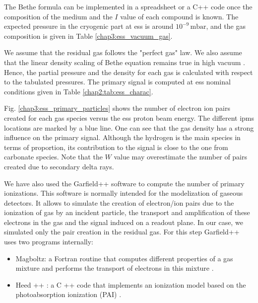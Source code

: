 \begin{refsection}
  The Bethe formula can be implemented in a spreadsheet or a C++ code once the composition of the medium and the \(I\) value of each compound is known. The expected pressure in the cryogenic part at \acrshort{ess} is around \(10^{-9}\,\mathrm{mbar}\), and the gas composition is given in Table \ref{chap3:ess_vacuum_gas}.

  

  We assume that the residual gas follows the "perfect gas" law. We also assume that the linear density scaling of Bethe equation remains true in high vacuum \cite[p. 108]{egberts2012}\cite{Ishimaru1995}. Hence, the partial pressure and the density for each gas is calculated with respect to the tabulated pressures. The primary signal is computed at \acrshort{ess} nominal conditions given in Table \ref{chap2:tab:ess_charac}.

  Fig. \ref{chap3:ess_primary_particles} shows the number of electron ion pairs created for each gas species versus the \acrshort{ess} proton beam energy. The different \acrshort{ipm}s locations are marked by a blue line. One can see that the gas density has a strong influence on the primary signal. Although the hydrogen is the main species in terms of proportion, its contribution to the signal is close to the one from carbonate species. Note that the \(W\) value may overestimate the number of pairs created due to secondary delta rays.
  

  We have also used the Garfield++ software to compute the number of primary  ionizations. This software is normally intended for the modelization of gaseous detectors. It allows to simulate the creation of electron/ion pairs due to the ionization of gas by an incident particle, the transport and amplification of these electrons in the gas and the signal induced on a readout plane. In our case, we simulated only the pair creation in the residual gas. For this step Garfield++ uses two programs internally:
  \begin{itemize}
    \item Magboltz: a Fortran routine that computes different properties of a gas mixture and performs the transport of electrons in this mixture \cite{Biagi1989}.
    \item Heed ++ \cite{Smirnov2005}: a C ++ code that implements an ionization model based on the photoabsorption ionization (PAI) \cite{Allison1980}.
  \end{itemize}


\end{refsection}
